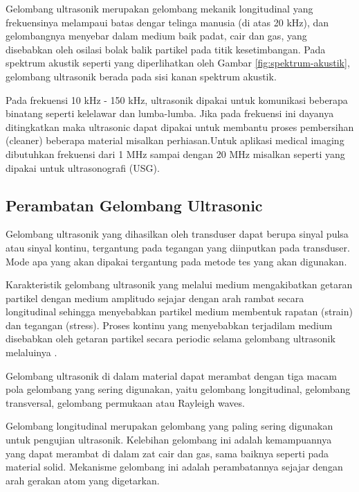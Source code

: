 Gelombang ultrasonik merupakan gelombang mekanik longitudinal yang frekuensinya melampaui batas dengar telinga manusia (di atas 20 kHz), dan 
gelombangnya menyebar dalam medium baik padat, cair dan gas, yang disebabkan oleh osilasi bolak balik partikel pada titik kesetimbangan. 
Pada spektrum akustik seperti yang diperlihatkan oleh Gambar \ref{fig:spektrum-akustik}, gelombang ultrasonik berada pada sisi kanan spektrum akustik.

Pada frekuensi 10 kHz - 150 kHz, ultrasonik dipakai untuk komunikasi beberapa binatang seperti kelelawar dan lumba-lumba. Jika pada frekuensi ini 
dayanya ditingkatkan maka ultrasonic dapat dipakai untuk membantu proses pembersihan (cleaner) beberapa material misalkan perhiasan.Untuk aplikasi 
medical imaging dibutuhkan frekuensi dari 1 MHz sampai dengan 20 MHz misalkan seperti yang dipakai untuk ultrasonografi (USG).

\subsection{Perambatan Gelombang Ultrasonic}

Gelombang ultrasonik yang dihasilkan oleh transduser dapat berupa sinyal pulsa atau sinyal kontinu, tergantung pada tegangan yang diinputkan pada 
transduser. Mode apa yang akan dipakai tergantung pada metode tes yang akan digunakan. 

Karakteristik gelombang ultrasonik yang melalui medium mengakibatkan getaran partikel dengan medium amplitudo sejajar dengan arah rambat secara 
longitudinal sehingga menyebabkan partikel medium membentuk rapatan (strain) dan tegangan (stress). Proses kontinu yang menyebabkan terjadilam medium disebabkan oleh getaran partikel secara periodic selama gelombang ultrasonik melaluinya \parencite{halliday2010physics}.

Gelombang ultrasonik di dalam material dapat merambat dengan tiga macam pola gelombang yang sering digunakan, yaitu gelombang longitudinal, 
gelombang transversal, gelombang permukaan atau Rayleigh waves. 

Gelombang longitudinal merupakan gelombang yang paling sering digunakan untuk pengujian ultrasonik. Kelebihan gelombang ini adalah kemampuannya 
yang dapat merambat di dalam zat cair dan gas, sama baiknya seperti pada material solid. Mekanisme gelombang ini adalah perambatannya sejajar 
dengan arah gerakan atom yang digetarkan.

